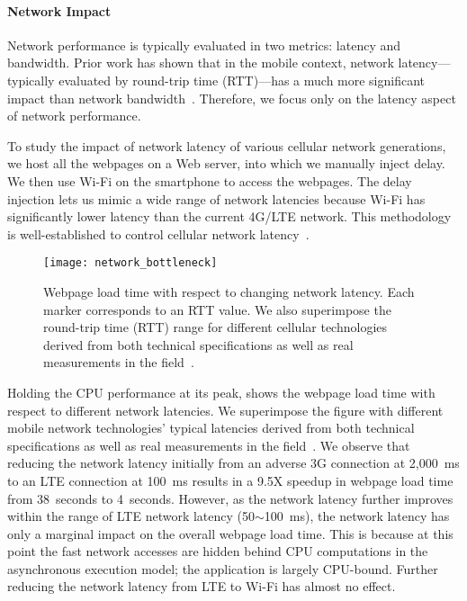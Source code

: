 \paragraph{Network Impact} Network performance is typically evaluated in two metrics: latency and bandwidth. Prior work has shown that in the mobile context, network latency---typically evaluated by round-trip time (RTT)---has a much more significant impact than network bandwidth~\cite{HPBN,browser-slow}. Therefore, we focus only on the latency aspect of network performance.

To study the impact of network latency of various cellular network generations, we host all the webpages on a Web server, into which we manually inject delay. We then use Wi-Fi on the smartphone to access the webpages. The delay injection lets us mimic a wide range of network latencies because Wi-Fi has significantly lower latency than the current 4G/LTE network. This methodology is well-established to control cellular network latency~\cite{browser-slow}.

\begin{figure}[t]
  \centering
  \texttt{[image: network\_bottleneck]}
  \caption{Webpage load time with respect to changing network latency. Each marker corresponds to an RTT value. We also superimpose the round-trip time (RTT) range for different cellular technologies derived from both technical specifications as well as real measurements in the field~\cite{HPBN,carrier_measure}.}
  \label{fig:network_bottleneck}
\end{figure}

Holding the CPU performance at its peak,  shows the webpage load time with respect to different network latencies. We superimpose the figure with different mobile network technologies' typical latencies derived from both technical specifications as well as real measurements in the field~\cite{HPBN,carrier_measure}. We observe that reducing the network latency initially from an adverse 3G connection at 2,000~ms to an LTE connection at 100~ms results in a 9.5X speedup in webpage load time from 38~seconds to 4~seconds. However, as the network latency further improves within the range of LTE network latency (50$\sim$100~ms), the network latency has only a marginal impact on the overall webpage load time. This is because at this point the fast network accesses are hidden behind CPU computations in the asynchronous execution model; the application is largely CPU-bound. Further reducing the network latency from LTE to Wi-Fi has almost no effect.

